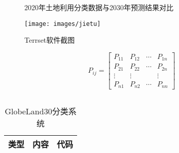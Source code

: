 	\begin{figure}[htbp]
	\centering
	\caption{2020年土地利用分类数据与2030年预测结果对比}
	\label{Fig.3}
\end{figure}


	\begin{figure}
	\centering
	\texttt{[image: images/jietu]}
	\caption{Terrset软件截图}
	\label{Fig.main.3}
\end{figure}


	\begin{equation}\label{Equa.main.2}
	P_{i j}=\left[\begin{array}{cccc}
		P_{11} & P_{12} & \cdots & P_{1 n} \\
		P_{21} & P_{22} & \cdots & P_{2 n} \\
		\vdots & \vdots & & \vdots \\
		P_{n 1} & P_{n 2} & \cdots & P_{n n}
	\end{array}\right]
\end{equation}



	\begin{columns}
	\qquad 
	\par

	\par
	
\end{columns}




	\begin{table}[htbp]
	\tiny
	\centering
	\caption{GlobeLand30分类系统}
	\begin{tabular}{c| m{24.78em}| c}
		\hline
		\textcolor[rgb]{ .2,  .2,  .2}{\textbf{类型}} &
		\centering\textcolor[rgb]{ .2,  .2,  .2}{\textbf{内容}} &
		\textcolor[rgb]{ .2,  .2,  .2}{\textbf{代码}}
		\\
		\hline
	\end{tabular}%
	\label{Table.main.1}%
\end{table}%


